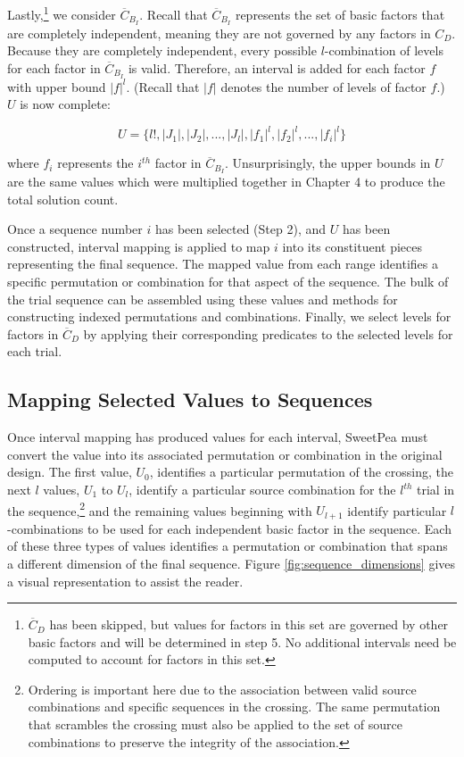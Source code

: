 Lastly,\footnote{$\overline{C}_D$ has been skipped, but values for factors in this set are governed by other basic factors and will be determined in step 5. No additional intervals need be computed to account for factors in this set.} we consider $\overline{C}_{B_I}$. Recall that $\overline{C}_{B_I}$ represents the set of basic factors that are completely independent, meaning they are not governed by any factors in $C_D$. Because they are completely independent, every possible $l$-combination of levels for each factor in $\overline{C}_{B_I}$ is valid. Therefore, an interval is added for each factor $f$ with upper bound $|f|^l$. (Recall that $|f|$ denotes the number of levels of factor $f$.) $U$ is now complete:

\[
U = \{ l!, |J_1|, |J_2|, ..., |J_l|, |f_1|^l, |f_2|^l, ..., |f_i|^l\}
\]

\noindent where $f_i$ represents the $i^{th}$ factor in $\overline{C}_{B_I}$. Unsurprisingly, the upper bounds in $U$ are the same values which were multiplied together in Chapter 4 to produce the total solution count.

Once a sequence number $i$ has been selected (Step 2), and $U$ has been constructed, interval mapping is applied to map $i$ into its constituent pieces representing the final sequence. The mapped value from each range identifies a specific permutation or combination for that aspect of the sequence. The bulk of the trial sequence can be assembled using these values and methods for constructing indexed permutations and combinations. Finally, we select levels for factors in $\overline{C}_D$ by applying their corresponding predicates to the selected levels for each trial.


\subsection{Mapping Selected Values to Sequences}

Once interval mapping has produced values for each interval, SweetPea must convert the value into its associated permutation or combination in the original design. The first value, $U_0$, identifies a particular permutation of the crossing, the next $l$ values, $U_1$ to $U_l$, identify a particular source combination for the $l^{th}$ trial in the sequence,\footnote{Ordering is important here due to the association between valid source combinations and specific sequences in the crossing. The same permutation that scrambles the crossing must also be applied to the set of source combinations to preserve the integrity of the association.} and the remaining values beginning with $U_{l+1}$ identify particular $l$-combinations to be used for each independent basic factor in the sequence. Each of these three types of values identifies a permutation or combination that spans a different dimension of the final sequence. Figure \ref{fig:sequence_dimensions} gives a visual representation to assist the reader.

